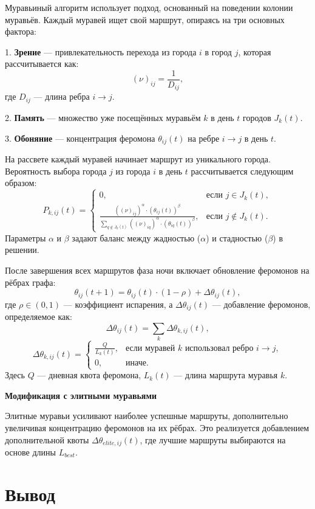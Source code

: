 Муравьиный алгоритм использует подход, основанный на поведении колонии муравьёв. Каждый муравей ищет свой маршрут, опираясь на три основных фактора: 

1. \textbf{Зрение} — привлекательность перехода из города \(i\) в город \(j\), которая рассчитывается как:
   \[
   (\nu)_{ij} = \frac{1}{D_{ij}},
   \]
   где \(D_{ij}\) — длина ребра \(i \rightarrow j\).

2. \textbf{Память} — множество уже посещённых муравьём \(k\) в день \(t\) городов \(J_k(t)\).

3. \textbf{Обоняние} — концентрация феромона \(\theta_{ij}(t)\) на ребре \(i \rightarrow j\) в день \(t\).

На рассвете каждый муравей начинает маршрут из уникального города. Вероятность выбора города \(j\) из города \(i\) в день \(t\) рассчитывается следующим образом:
\[
P_{k,ij}(t) =
\begin{cases} 
0, & \text{если } j \in J_k(t), \\
\frac{((\nu)_{ij})^\alpha \cdot (\theta_{ij}(t))^\beta}{\sum_{q \notin J_k(t)} ((\nu)_{iq})^\alpha \cdot (\theta_{iq}(t))^\beta}, & \text{если } j \notin J_k(t).
\end{cases}
\]
Параметры \(\alpha\) и \(\beta\) задают баланс между жадностью (\(\alpha\)) и стадностью (\(\beta\)) в решении.

После завершения всех маршрутов фаза ночи включает обновление феромонов на рёбрах графа:
\[
\theta_{ij}(t+1) = \theta_{ij}(t) \cdot (1 - \rho) + \Delta \theta_{ij}(t),
\]
где \(\rho \in (0, 1)\) — коэффициент испарения, а \(\Delta \theta_{ij}(t)\) — добавление феромонов, определяемое как:
\[
\Delta \theta_{ij}(t) = \sum_{k} \Delta \theta_{k,ij}(t),
\]
\[
\Delta \theta_{k,ij}(t) =
\begin{cases} 
\frac{Q}{L_k(t)}, & \text{если муравей } k \text{ использовал ребро } i \rightarrow j, \\
0, & \text{иначе.}
\end{cases}
\]
Здесь \(Q\) — дневная квота феромона, \(L_k(t)\) — длина маршрута муравья \(k\).

\textbf{Модификация с элитными муравьями}

Элитные муравьи усиливают наиболее успешные маршруты, дополнительно увеличивая концентрацию феромонов на их рёбрах. Это реализуется добавлением дополнительной квоты \(\Delta \theta_{elite,ij}(t)\), где лучшие маршруты выбираются на основе длины \(L_{best}\).

\section*{Вывод}

